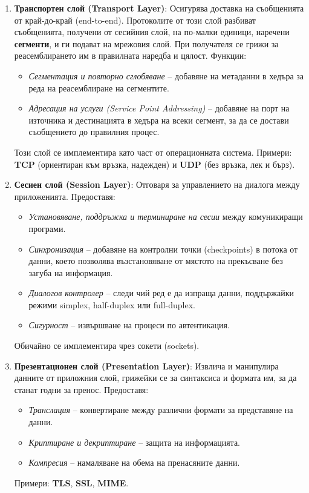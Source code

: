 \documentclass{scrartcl}
\begin{document}
\begin{FlushLeft}
\begin{enumerate}
    \item \textbf{Транспортен слой (Transport Layer)}: Осигурява доставка на съобщенията от край-до-край (end-to-end). Протоколите от този слой разбиват съобщенията, получени от сесийния слой, на по-малки единици, наречени \textbf{сегменти}, и ги подават на мрежовия слой. При получателя се грижи за реасемблирането им в правилната наредба и цялост. Функции:
    \begin{itemize}
        \item \textit{Сегментация и повторно сглобяване} – добавяне на метаданни в хедъра за реда на реасемблиране на сегментите.
        \item \textit{Адресация на услуги (Service Point Addressing)} – добавяне на порт на източника и дестинацията в хедъра на всеки сегмент, за да се достави съобщението до правилния процес.
    \end{itemize}
    Този слой се имплементира като част от операционната система. Примери: \textbf{TCP} (ориентиран към връзка, надежден) и \textbf{UDP} (без връзка, лек и бърз).

    \item \textbf{Сесиен слой (Session Layer)}: Отговаря за управлението на диалога между приложенията. Предоставя:
    \begin{itemize}
        \item \textit{Установяване, поддръжка и терминиране на сесии} между комуникиращи програми.
        \item \textit{Синхронизация} – добавяне на контролни точки (checkpoints) в потока от данни, което позволява възстановяване от мястото на прекъсване без загуба на информация.
        \item \textit{Диалогов контролер} – следи чий ред е да изпраща данни, поддържайки режими simplex, half-duplex или full-duplex.
        \item \textit{Сигурност} – извършване на процеси по автентикация.
    \end{itemize}
    Обичайно се имплементира чрез сокети (sockets).

    \item \textbf{Презентационен слой (Presentation Layer)}: Извлича и манипулира данните от приложния слой, грижейки се за синтаксиса и формата им, за да станат годни за пренос. Предоставя:
    \begin{itemize}
        \item \textit{Транслация} – конвертиране между различни формати за представяне на данни.
        \item \textit{Криптиране и декриптиране} – защита на информацията.
        \item \textit{Компресия} – намаляване на обема на пренасяните данни.
    \end{itemize}
    Примери: \textbf{TLS}, \textbf{SSL}, \textbf{MIME}.


\end{enumerate}
\end{FlushLeft}
\end{document}

